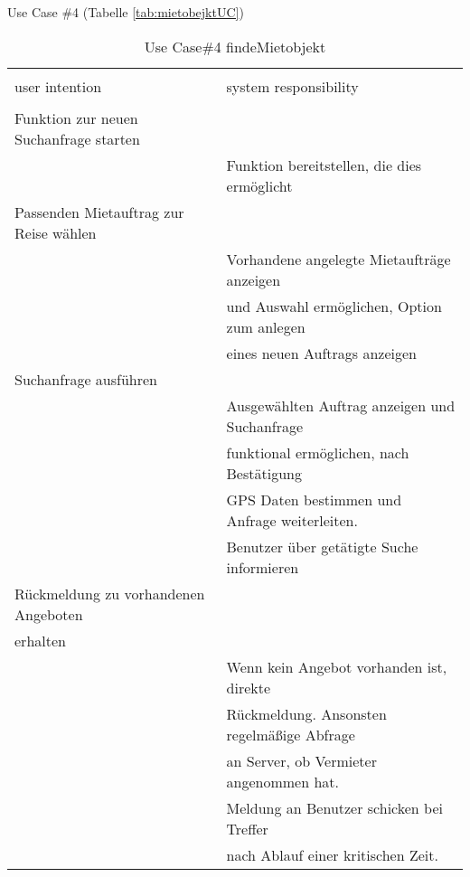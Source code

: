 \newpage
Use Case \#4 (Tabelle \ref{tab:mietobejktUC})
\begin{table}[H]
\caption{Use Case\#4 findeMietobjekt }
\centering
\begin{tabular}{l l}
\\ [-0.5ex]

\hline\hline
\\ [-0.5ex]
user intention & system responsibility
\\ [1.5ex]
\hline
\\ [-0.5ex]
Funktion zur neuen Suchanfrage starten    &                                   \\[1ex]
                              & Funktion bereitstellen, die dies ermöglicht   \\[1ex]
Passenden Mietauftrag zur Reise wählen &                                   \\[1ex]
                              & Vorhandene angelegte Mietaufträge anzeigen \\[1ex]
                              & und Auswahl ermöglichen, Option zum anlegen   \\[1ex]
                              & eines neuen Auftrags anzeigen              \\[1ex]
Suchanfrage ausführen               &                                   \\[1ex] 
                              & Ausgewählten Auftrag anzeigen  und Suchanfrage   \\[1ex]
                              & funktional ermöglichen, nach Bestätigung      \\[1ex]
                              & GPS Daten bestimmen und Anfrage weiterleiten. \\[1ex]
                              & Benutzer über getätigte Suche informieren     \\[1ex]
Rückmeldung zu vorhandenen Angeboten   &                                   \\[1ex]
erhalten                      &                                   \\[1ex]
                              & Wenn kein Angebot vorhanden ist, direkte      \\[1ex]
                              & Rückmeldung. Ansonsten regelmäßige Abfrage    \\[1ex]
                              & an Server, ob Vermieter angenommen hat.    \\[1ex]
                              & Meldung an Benutzer schicken bei Treffer      \\[1ex]
                              & nach Ablauf einer kritischen Zeit.            \\[1ex]
\hline
\end{tabular}
\label{tab:mietobjektUC}
\end{table}

